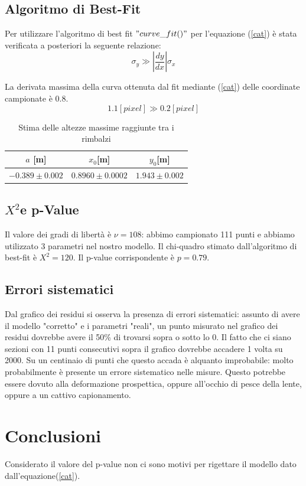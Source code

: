 \documentclass{article}
\begin{document}
\subsection{Algoritmo di Best-Fit}
Per utilizzare l'algoritmo di best fit $"curve\_fit()"$ per l'equazione (\ref{cat}) è stata verificata a posteriori la seguente relazione:
\begin{equation}
\sigma_{y} \gg \left| \frac{dy}{dx} \right| \sigma_{x}
\end{equation}

La derivata massima della curva ottenuta dal fit mediante (\ref{cat}) delle coordinate campionate è 0.8. 
\begin{equation}
1.1 [pixel] \gg 0.2[pixel]
\end{equation}


\begin{table}
\centering
	\begin{tabular}{|c|c|c|}

	\hline
		$a$ [m] & $x_0$[m] & $y_0$[m]\\
	\hline
	
		$-0.389\pm0.002$ & $0.8960\pm0.0002$ & $1.943\pm0.002$\\
	\hline
	
	\end{tabular}
	\caption{Stima delle altezze massime raggiunte tra i rimbalzi}
	
\end{table}


\subsection{$X^2$e p-Value}
Il valore dei gradi di libertà è $\nu=108$: abbimo campionato 111 punti e abbiamo utilizzato 3 parametri nel nostro modello. 
Il chi-quadro stimato dall'algoritmo di best-fit è $X^2=120$.
Il p-value corrispondente è $p=0.79$.

\subsection{Errori sistematici}
Dal grafico dei residui si osserva la presenza di errori sistematici: assunto di avere il modello "corretto" e i parametri "reali", un punto misurato nel grafico dei residui dovrebbe avere il 50\% di trovarsi sopra o sotto lo 0.
Il fatto che ci siano sezioni con 11 punti consecutivi sopra il grafico dovrebbe accadere 1 volta su 2000.  Su un centinaio di punti che questo accada è alquanto improbabile: molto probabilmente è presente un errore sistematico nelle misure. 
Questo potrebbe essere dovuto alla deformazione prospettica, oppure  all'occhio di pesce della lente, oppure a un cattivo capionamento. 

\section{Conclusioni}
Considerato il valore del p-value non ci sono motivi per rigettare il modello dato dall'equazione(\ref{cat}).
\end{document}
